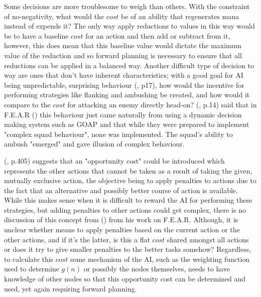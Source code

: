 \documentclass[11pt, a4paper]{article}
\begin{document}
Some decisions are more troublesome to weigh than others. With the constraint of no-negativity, what would the $cost$ be of an ability that regenerates mana instead of expends it? The only way apply reductions to values in this way would be to have a baseline $cost$ for an action and then add or subtract from it, however, this does mean that this baseline value would dictate the maximum value of the reduction and so forward planning is necessary to ensure that all reductions can be applied in a balanced way. Another difficult type of decision to way are ones that don't have inherent characteristics; with a good goal for AI being unpredictable, surprising behaviour (\cite{scott2002illusion}, p17), how would the incentive for performing strategies like flanking and ambushing be created, and how would it compare to the $cost$ for attacking an enemy directly head-on? \citeauthor{orkin2006three} (\citeyear{orkin2006three}, p.14) said that in F.E.A.R (\cite{FEAR}) this behaviour just came naturally from using a dynamic decision making system such as GOAP and that while they were prepared to implement "complex squad behaviour", none was implemented. The squad's ability to ambush "emerged" and gave illusion of complex behaviour.

\citeauthor{harmon2002economic} (\citeyear{harmon2002economic}, p.405) suggests that an "opportunity cost" could be introduced which represents the other actions that cannot be taken as a result of taking the given, mutually exclusive action, the objective being to apply penalties to actions due to the fact that an alternative and possibly better course of action is available. While this makes sense when it is difficult to reward the AI for performing these strategies, but adding penalties to other actions could get complex, there is no discussion of this concept from \citeauthor{orkin2006three} (\citeyear{orkin2006three}) from his work on F.E.A.R. Although, it is unclear whether \citeauthor{harmon2002economic} means to apply penalties based on the current action or the other actions, and if it's the latter, is this a flat $cost$ shared amongst all actions or does it try to give smaller penalties to the better tasks somehow? Regardless, to calculate this $cost$ some mechanism of the AI, such as the weighting function used to determine $g(n)$ or possibly the nodes themselves, needs to have knowledge of other nodes so that this opportunity cost can be determined and used, yet again requiring forward planning.
\end{document}
